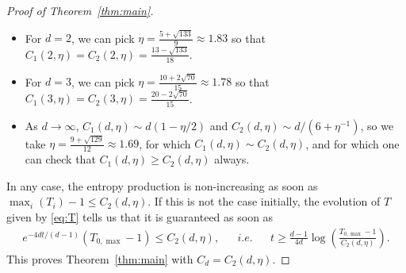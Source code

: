 \documentclass[10pt,a4paper]{amsart}
\begin{document}
\begin{proof}[Proof of Theorem~\ref{thm:main}]
\begin{itemize}
    \item For $d=2$, we can pick $\eta=\frac{5+\sqrt{133}}{9}\approx 1.83$ so that $C_1(2,\eta)=C_2(2,\eta)=\frac{13-\sqrt{133}}{18}$. 
    \item For $d=3$, we can pick
$\eta=\frac{10+2\sqrt{70}}{15}\approx 1.78$ so that $C_1(3,\eta)=C_2(3,\eta)=\frac{20-2\sqrt{70}}{15}$.
    \item As $d\rightarrow \infty$, $C_1(d,\eta) \sim d(1-\eta/2) $ and $C_2(d,\eta) \sim d/(6+\eta^{-1}) $, so we take $\eta=\frac{9+\sqrt{129}}{12}\approx 1.69$, for which $C_1(d,\eta)\sim C_2(d,\eta)$, and for which one can check that $C_1(d,\eta)\geq C_2(d,\eta)$ always.
\end{itemize}
In any case, the entropy production is non-increasing as soon as $\max_i(T_i)-1\leq C_2(d,\eta)$. If this is not the case initially, the evolution of $T$ given by \eqref{eq:T} tells us that it is guaranteed as soon as
\begin{align*}
    e^{-4dt/(d-1)}(T_{0,\max}-1)\leq C_2(d,\eta), && \textit{i.e.} && t\geq \frac{d-1}{4d}\log\left(\frac{T_{0,\max}-1}{C_2(d,\eta)}\right).
\end{align*}
This proves Theorem~\ref{thm:main} with $C_d=C_2(d,\eta)$.
\end{proof}
\end{document}
